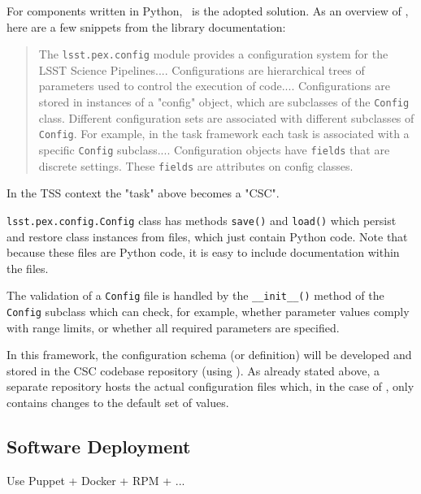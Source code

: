 For components written in Python, \pexC~is the adopted solution. As an overview of \pexC, here are a few snippets from the library documentation:

\begin{quotation}
The \texttt{lsst.pex.config} module provides a configuration system for the LSST Science Pipelines.... Configurations are hierarchical trees of parameters used to control the execution of code.... Configurations are stored in instances of a "config" object, which are subclasses of the \texttt{Config} class. Different configuration sets are associated with different subclasses of \texttt{Config}. For example, in the task framework each task is associated with a specific \texttt{Config} subclass.... Configuration objects have \texttt{fields} that are discrete settings. These \texttt{fields} are attributes on config classes.
\end{quotation}

In the TSS context the "task" above becomes a "CSC". 

\texttt{lsst.pex.config.Config} class has methods \texttt{save()} and \texttt{load()} which persist and restore class instances from files, which just contain Python code. Note that because these files are Python code, it is easy to include documentation within the files.

The validation of a \texttt{Config} file is handled by the \texttt{\_\_init\_\_()} method of the \texttt{Config} subclass which can check, for example, whether parameter values comply with range limits, or whether all required parameters are specified.

In this framework, the configuration schema (or definition) will be developed and stored in the CSC codebase repository (using \pexC). As already stated above, a separate repository hosts the actual configuration files which, in the case of \pexC, only contains changes to the default set of values.



%


\subsection{Software Deployment}\label{sect:deploy}

Use Puppet + Docker +  RPM + ...














